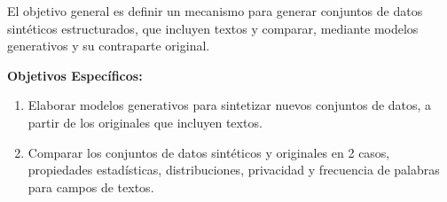 El objetivo general es definir un mecanismo para generar conjuntos de datos sintéticos estructurados, que incluyen textos y comparar, mediante modelos generativos y su contraparte original.

\textbf{Objetivos Específicos:} 
\begin{enumerate}
    \item Elaborar modelos generativos para sintetizar nuevos conjuntos de datos, a partir de los originales que incluyen textos.
    \item Comparar los conjuntos de datos sintéticos y originales en 2 casos, propiedades estadísticas, distribuciones, privacidad y frecuencia de palabras para campos de textos.
\end{enumerate}
